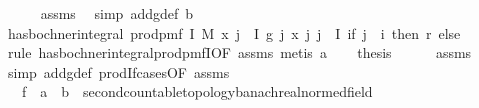 \begin{isabellebody}
\ \ \ \ \isamarkupfalse%
\ assms{\isacharparenleft}{\kern0pt}{}{\isacharparenright}{\kern0pt}\ \isamarkupfalse%
\ {\isacharparenleft}{\kern0pt}simp\ add{\isacharcolon}{\kern0pt}g{\isacharunderscore}{\kern0pt}def\ b{\isacharparenright}{\kern0pt}\isanewline
\ \ \isamarkupfalse%
\ {\isachardoublequoteopen}has{\isacharunderscore}{\kern0pt}bochner{\isacharunderscore}{\kern0pt}integral\ {\isacharparenleft}{\kern0pt}prod{\isacharunderscore}{\kern0pt}pmf\ I\ M{\isacharparenright}{\kern0pt}\ {\isacharparenleft}{\kern0pt}{\isasymlambda}x{\isachardot}{\kern0pt}\ {\isacharparenleft}{\kern0pt}{\isasymProd}j\ {\isasymin}\ I{\isachardot}{\kern0pt}\ g\ j\ {\isacharparenleft}{\kern0pt}x\ j{\isacharparenright}{\kern0pt}{\isacharparenright}{\kern0pt}{\isacharparenright}{\kern0pt}\ {\isacharparenleft}{\kern0pt}{\isasymProd}j\ {\isasymin}\ I{\isachardot}{\kern0pt}\ if\ j\ {\isacharequal}{\kern0pt}\ i\ then\ r\ else\ {}{\isacharparenright}{\kern0pt}{\isachardoublequoteclose}\isanewline
\ \ \ \ \isamarkupfalse%
\ {\isacharparenleft}{\kern0pt}rule\ has{\isacharunderscore}{\kern0pt}bochner{\isacharunderscore}{\kern0pt}integral{\isacharunderscore}{\kern0pt}prod{\isacharunderscore}{\kern0pt}pmfI{\isacharbrackleft}{\kern0pt}OF\ assms{\isacharparenleft}{\kern0pt}{}{\isacharparenright}{\kern0pt}{\isacharbrackright}{\kern0pt}{\isacharcomma}{\kern0pt}\ metis\ a{\isacharparenright}{\kern0pt}\isanewline
\ \ \isamarkupfalse%
\ {\isacharquery}{\kern0pt}thesis\isanewline
\ \ \ \ \isamarkupfalse%
\ assms{\isacharparenleft}{\kern0pt}{}{\isacharparenright}{\kern0pt}\ \isamarkupfalse%
\ {\isacharparenleft}{\kern0pt}simp\ add{\isacharcolon}{\kern0pt}g{\isacharunderscore}{\kern0pt}def\ prod{\isachardot}{\kern0pt}If{\isacharunderscore}{\kern0pt}cases{\isacharbrackleft}{\kern0pt}OF\ assms{\isacharparenleft}{\kern0pt}{}{\isacharparenright}{\kern0pt}{\isacharbrackright}{\kern0pt}{\isacharparenright}{\kern0pt}\isanewline
{}\isamarkupfalse%
%
\endisatagproof
{\isafoldproof}%
%
\isadelimproof
\isanewline
%
\endisadelimproof
\isanewline
{}\isamarkupfalse%
\isanewline
\ \ \ f\ {\isacharcolon}{\kern0pt}{\isacharcolon}{\kern0pt}\ {\isachardoublequoteopen}{\isacharprime}{\kern0pt}a\ {\isasymRightarrow}\ {\isacharparenleft}{\kern0pt}{\isacharprime}{\kern0pt}b\ {\isacharcolon}{\kern0pt}{\isacharcolon}{\kern0pt}\ {\isacharbraceleft}{\kern0pt}second{\isacharunderscore}{\kern0pt}countable{\isacharunderscore}{\kern0pt}topology{\isacharcomma}{\kern0pt}banach{\isacharcomma}{\kern0pt}real{\isacharunderscore}{\kern0pt}normed{\isacharunderscore}{\kern0pt}field{\isacharbraceright}{\kern0pt}{\isacharparenright}{\kern0pt}{\isachardoublequoteclose}\isanewline

\end{isabellebody}
